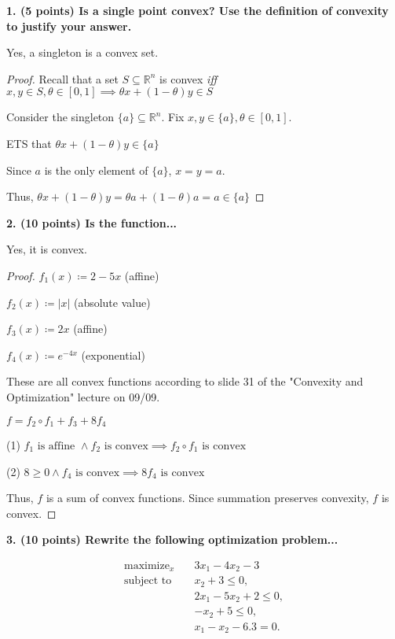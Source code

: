 \documentclass[a4paper,10pt]{article}
\theoremstyle{definition}
\begin{document}
\textbf{1. (5 points) Is a single point convex? Use the definition of convexity to justify your answer.}

Yes, a singleton is a convex set.

\begin{proof} 
Recall that a set $S \subseteq \mathbb{R}^n$ is convex \textit{iff}
$x, y \in S, \theta \in [0, 1] \implies \theta x + (1 - \theta) y \in S$

Consider the singleton $\{a\}\subseteq\mathbb{R}^n$. Fix $x, y \in \{a\}, \theta \in [0,1]$.

ETS that $\theta x + (1 - \theta) y \in \{a\}$

Since $a$ is the only element of $\{a\}$, $x = y = a$.

Thus, $\theta x + (1 - \theta) y = \theta a + (1 - \theta) a = a \in \{a\}$
\end{proof} 

\bigskip
\textbf{2. (10 points) Is the function...}

Yes, it is convex.

\begin{proof}

$f_1(x) \coloneq 2 - 5x$ (affine)

$f_2(x) \coloneq |x|$ (absolute value)

$f_3(x) \coloneq 2x$ (affine)

$f_4(x) \coloneq e^{-4x}$ (exponential)

These are all convex functions according to slide 31 of the "Convexity and Optimization" lecture on 09/09.

$f = f_2 \circ f_1 + f_3 + 8f_4$

(1) $f_1 \text{ is affine } \land f_2 \text{ is convex} \implies f_2 \circ f_1 \text{ is convex}$

(2) $8 \geq 0 \land f_4 \text{ is convex} \implies 8f_4 \text{ is convex}$ 

Thus, $f$ is a sum of convex functions.
Since summation preserves convexity, $f$ is convex.
\end{proof}


\bigskip
\textbf{3. (10 points) Rewrite the following optimization problem...}

\[
\begin{aligned}
    \text{maximize}_{x} \quad & 3x_1 - 4x_2 - 3 \\
    \text{subject to} \quad & x_2 + 3 \leq 0, \\
                            & 2x_1 - 5x_2 + 2 \leq 0, \\
                            & -x_2 + 5 \leq 0, \\
                            & x_1 - x_2 - 6.3 = 0.
\end{aligned}
\]
\end{document}
